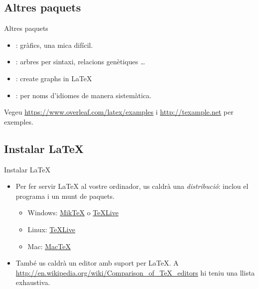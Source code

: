 \subsection{Altres paquets}
\begin{frame}{Altres paquets}
\begin{itemize}
\item {}: gràfics, una mica difícil.
\item {}: arbres per sintaxi, relacions genètiques \dots
\item {}: create graphs in \LaTeX{}
\item {}: per noms d'idiomes de manera sistemàtica.
\end{itemize}
Vegeu \url{https://www.overleaf.com/latex/examples} i \url{http://texample.net}
per exemples.
\end{frame}

\subsection{Instalar \LaTeX{}}
\begin{frame}{Instalar \LaTeX}
\begin{itemize}
\item Per fer servir \LaTeX{} al vostre ordinador, us caldrà una \emph{distribució}:
    inclou el programa  i un munt de paquets.
\begin{itemize}
\item Windows: \href{http://miktex.org/}{Mik\TeX} o \href{http://tug.org/texlive/}{\TeX Live}
\item Linux: \href{http://tug.org/texlive/}{\TeX Live}
\item Mac: \href{http://tug.org/mactex/}{Mac\TeX}
\end{itemize}
\item També us caldrà un editor amb suport per \LaTeX{}. A \url{http://en.wikipedia.org/wiki/Comparison_of_TeX_editors} hi teniu una llista exhaustiva.
\end{itemize}
\end{frame}


